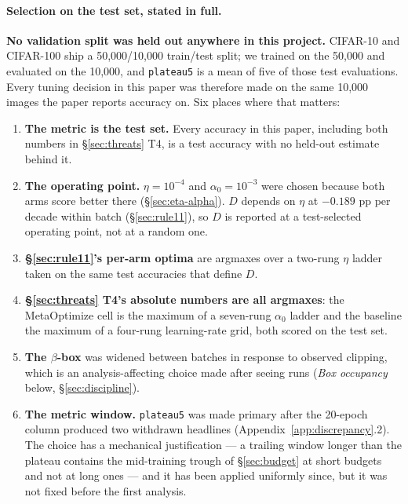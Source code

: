 \documentclass[10pt,letterpaper]{article}
\newcommand{\Dstat}{D}                         %
\newcommand{\plateau}{\texttt{plateau5}}
\begin{document}
\paragraph{Selection on the test set, stated in full.}
\textbf{No validation split was held out anywhere in this project.} CIFAR-10 and CIFAR-100
\citep{krizhevsky2009cifar} ship a 50{,}000/10{,}000 train/test split; we trained on the 50{,}000
and evaluated on the 10{,}000, and \plateau{} is a mean of five of those test evaluations. Every
tuning decision in this paper was therefore made on the same 10{,}000 images the paper reports
accuracy on. Six places where that matters:

\begin{enumerate}
\item \textbf{The metric is the test set.} Every accuracy in this paper, including both numbers
  in \S\ref{sec:threats} T4, is a test accuracy with no held-out estimate behind it.
\item \textbf{The operating point.} $\eta = 10^{-4}$ and $\alpha_0 = 10^{-3}$ were chosen
  because both arms score better there (\S\ref{sec:eta-alpha}). $\Dstat$ depends on $\eta$ at
  $-0.189$ pp per decade within batch (\S\ref{sec:rule11}), so $\Dstat$ is reported at a
  test-selected operating point, not at a random one.
\item \textbf{\S\ref{sec:rule11}'s per-arm optima} are argmaxes over a two-rung $\eta$ ladder
  taken on the same test accuracies that define $\Dstat$.
\item \textbf{\S\ref{sec:threats} T4's absolute numbers are all argmaxes}: the MetaOptimize cell
  is the maximum of a seven-rung $\alpha_0$ ladder and the baseline the maximum of a four-rung
  learning-rate grid, both scored on the test set.
\item \textbf{The $\beta$-box} was widened between batches in response to observed clipping,
  which is an analysis-affecting choice made after seeing runs (\emph{Box occupancy} below,
  \S\ref{sec:discipline}).
\item \textbf{The metric window.} \plateau{} was made primary after the 20-epoch column produced
  two withdrawn headlines (Appendix~\ref{app:discrepancy}.2). The choice has a mechanical
  justification --- a trailing window longer than the plateau contains the mid-training trough
  of \S\ref{sec:budget} at short budgets and not at long ones --- and it has been applied
  uniformly since, but it was not fixed before the first analysis.
\end{enumerate}
\end{document}
